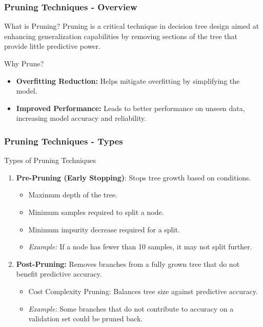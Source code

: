 \documentclass[aspectratio=169]{beamer}
\begin{document}
\begin{frame}[fragile]
  \frametitle{Pruning Techniques - Overview}
  \begin{block}{What is Pruning?}
    Pruning is a critical technique in decision tree design aimed at enhancing generalization capabilities by removing sections of the tree that provide little predictive power.
  \end{block}

  \begin{block}{Why Prune?}
    \begin{itemize}
      \item \textbf{Overfitting Reduction:} Helps mitigate overfitting by simplifying the model.
      \item \textbf{Improved Performance:} Leads to better performance on unseen data, increasing model accuracy and reliability.
    \end{itemize}
  \end{block}
\end{frame}

\begin{frame}[fragile]
  \frametitle{Pruning Techniques - Types}
  \begin{block}{Types of Pruning Techniques}
    \begin{enumerate}
      \item \textbf{Pre-Pruning (Early Stopping)}: Stops tree growth based on conditions.
      \begin{itemize}
        \item Maximum depth of the tree.
        \item Minimum samples required to split a node.
        \item Minimum impurity decrease required for a split.
        \item \textit{Example:} If a node has fewer than 10 samples, it may not split further.
      \end{itemize}
      
      \item \textbf{Post-Pruning:} Removes branches from a fully grown tree that do not benefit predictive accuracy.
      \begin{itemize}
        \item Cost Complexity Pruning: Balances tree size against predictive accuracy.
        \item \textit{Example:} Some branches that do not contribute to accuracy on a validation set could be pruned back.
      \end{itemize}
    \end{enumerate}
  \end{block}
\end{frame}
\end{document}
